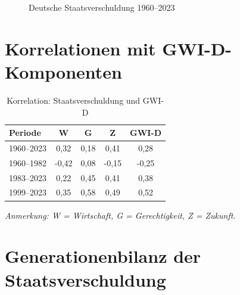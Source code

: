 \begin{figure}[ht]
    \centering
    \caption{Deutsche Staatsverschuldung 1960–2023}
    \label{fig:staatsverschuldung_verlauf}
\end{figure}

\section{Korrelationen mit GWI-D-Komponenten}

\begin{table}[ht]
    \centering
    \footnotesize
    \caption{Korrelation: Staatsverschuldung und GWI-D}
    \label{tab:korrelation_schulden_gwi}
    \begin{tabular}{@{}lcccc@{}}
        \toprule
        \textbf{Periode} & \textbf{W} & \textbf{G} & \textbf{Z} & \textbf{GWI-D} \\
        \midrule
        1960–2023 & 0,32 & 0,18 & 0,41 & 0,28 \\
        1960–1982 & -0,42 & 0,08 & -0,15 & -0,25 \\
        1983–2023 & 0,22 & 0,45 & 0,41 & 0,38 \\
        1999–2023 & 0,35 & 0,58 & 0,49 & 0,52 \\
        \bottomrule
    \end{tabular}
\end{table}

\begin{flushleft}
\scriptsize{\textit{Anmerkung: W = Wirtschaft, G = Gerechtigkeit, Z = Zukunft.}}
\end{flushleft}

\section{Generationenbilanz der Staatsverschuldung}

